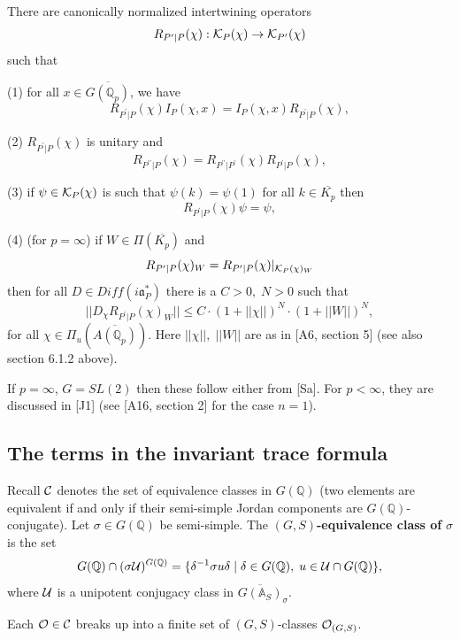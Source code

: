 \begin{conjecture}
There are canonically normalized intertwining operators 
\[
R_{P^{\prime }|P}(\chi ):{\cal{K}}_P(\chi )\rightarrow
{\cal{K}}_{P^{\prime}}(\chi ) 
\]
such that

(1) for all $x\in \overline{G({\mathbb{Q}}_p)}$, we have 
\[
R_{P^{\prime }|P}(\chi )I_P(\chi ,x)
=I_P(\chi ,x)R_{P^{\prime }|P}(\chi ), 
\]

(2) $R_{P^{\prime }|P}(\chi )$ is unitary and 
\[
R_{P^{\prime \prime }|P}(\chi )
=R_{P^{\prime \prime }|P^{\prime }}(\chi)R_{P^{\prime }|P}(\chi ), 
\]

(3) if $\psi \in {\cal K}_P(\chi )$ is such that
$\psi (k)=\psi (1)$
for all $k\in \overline{K_p}$ then 
\[
R_{P^{\prime }|P}(\chi )\psi =\psi , 
\]

(4) (for $p=\infty $) if $W\in \Pi (\overline{K_p})$ and 
\[
R_{P^{\prime }|P}(\chi )_W=R_{P^{\prime }|P}(\chi )|_{{\cal{K}}_P(\chi )_W}
\]
then for all $D\in Diff(i{\mathfrak {a}}_P^{*})$ there is a $C>0,\;N>0$ such
that 
\[
||D_\chi R_{P^{\prime }|P}(\chi )_W||\leq C\cdot (1+||\chi ||)^N\cdot
(1+||W||)^N,
\]
for all $\chi \in \Pi _u(\overline{A({\mathbb{Q}}_p)})$.
Here $||\chi||,\;||W||$ are as in [A6, section 5]
(see also section 6.1.2 above).
\end{conjecture}

If $p=\infty $, $G=SL(2)$ then these follow either from [Sa].
For $p<\infty$, they are discussed in [J1] (see [A16, section 2]
for the case $n=1$).

\subsection{The terms in the invariant trace formula}

Recall ${\cal C}$ denotes the set of equivalence classes in $G({\mathbb {Q}})$
(two elements are equivalent if and only if their semi-simple
Jordan components are $G({\mathbb{Q}})$-conjugate). Let
$\sigma \in G({\mathbb{Q}})$ be semi-simple. The
$(G,S)${\bf -equivalence class of }$\sigma $ is
the set 
\[
G({\mathbb{Q}})\cap (\sigma {\cal{U}})^{G({\mathbb{Q}})}
=\{\delta ^{-1}\sigma u\delta
\;|\;\delta \in G({\mathbb{Q}}),\;u\in {\cal{U}}\cap G({\mathbb{Q}})\}, 
\]
where ${\cal{U}}$ is a unipotent conjugacy class in
$\overline{G({\mathbb {A}}_S)}_\sigma$.

\begin{lemma}
Each ${\cal{O}}\in {\cal{C}}$ breaks up into a finite set of
$(G,S)$-classes ${\cal{O}}_{(G,S)}$.
\end{lemma}

